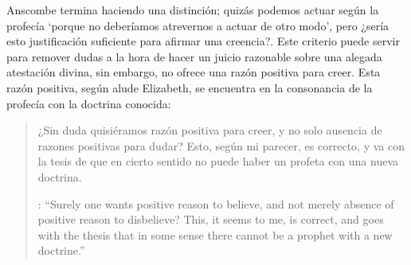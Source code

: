 Anscombe termina haciendo una distinción; quizás podemos actuar según la profecía \enquote*{porque no deberíamos atrevernos a actuar de otro modo}, pero ¿sería esto justificación suficiente para afirmar una creencia?. Este criterio puede servir para remover dudas a la hora de hacer un juicio razonable sobre una alegada atestación divina, sin embargo, no ofrece una razón positiva para creer. Esta razón positiva, según alude Elizabeth, se encuentra en la consonancia de la profecía con la doctrina conocida: \blockquote[{\cite[39]{anscombe2008faith:prophandmi}}: \enquote{Surely one wants positive reason to believe, and not merely absence of positive reason to disbelieve? This, it seems to me, is correct, and goes with the thesis that in some sense there cannot be a prophet with a new doctrine.}]{¿Sin duda quisiéramos razón positiva para creer, y no solo ausencia de razones positivas para dudar? Esto, según mi parecer, es correcto, y va con la tesis de que en cierto sentido no puede haber un profeta con una nueva doctrina.}
